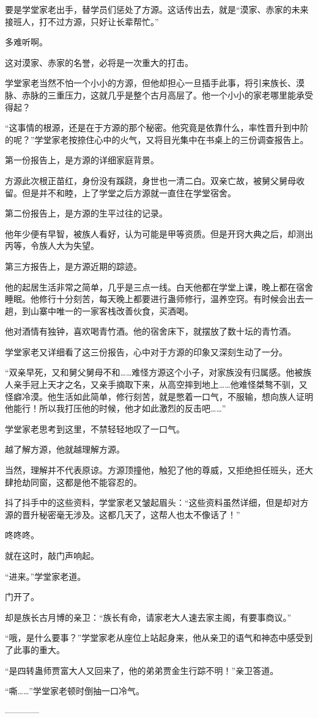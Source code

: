 \begin{this_body}
要是学堂家老出手，替学员们惩处了方源。这话传出去，就是“漠家、赤家的未来接班人，打不过方源，只好让长辈帮忙。”

多难听啊。

这对漠家、赤家的名誉，必将是一次重大的打击。

学堂家老当然不怕一个小小的方源，但他却担心一旦插手此事，将引来族长、漠脉、赤脉的三重压力，这就几乎是整个古月高层了。他一个小小的家老哪里能承受得起？

“这事情的根源，还是在于方源的那个秘密。他究竟是依靠什么，率性晋升到中阶的呢？”学堂家老按捺住心中的火气，又将目光集中在书桌上的三份调查报告上。

第一份报告上，是方源的详细家庭背景。

方源此次根正苗红，身份没有蹊跷，身世也一清二白。双亲亡故，被舅父舅母收留。但是并不和睦，上了学堂之后方源就一直住在学堂宿舍。

第二份报告上，是方源的生平过往的记录。

他年少便有早智，被族人看好，认为可能是甲等资质。但是开窍大典之后，却测出丙等，令族人大为失望。

第三方报告上，是方源近期的踪迹。

他的起居生活非常之简单，几乎是三点一线。白天他都在学堂上课，晚上都在宿舍睡眠。他修行十分刻苦，每天晚上都要进行蛊师修行，温养空窍。有时候会出去一趟，到山寨中唯一的一家客栈改善伙食，买酒喝。

他对酒情有独钟，喜欢喝青竹酒。他的宿舍床下，就摆放了数十坛的青竹酒。

学堂家老又详细看了这三份报告，心中对于方源的印象又深刻生动了一分。

“双亲早死，又和舅父舅母不和……难怪方源这个小子，对家族没有归属感。他被族人亲手冠上天才之名，又亲手摘取下来，从高空摔到地上……他难怪桀骜不驯，又怪癖冷漠。他生活如此简单，修行刻苦，就是憋着一口气，不服输，想向族人证明他能行！所以我打压他的时候，他才如此激烈的反击吧……”

学堂家老思考到这里，不禁轻轻地叹了一口气。

越了解方源，他就越理解方源。

当然，理解并不代表原谅。方源顶撞他，触犯了他的尊威，又拒绝担任班头，还大肆抢劫同窗，这都是他不能容忍的。

抖了抖手中的这些资料，学堂家老又皱起眉头：“这些资料虽然详细，但是却对方源的晋升秘密毫无涉及。这都几天了，这帮人也太不像话了！”

咚咚咚。

就在这时，敲门声响起。

“进来。”学堂家老道。

门开了。

却是族长古月博的亲卫：“族长有命，请家老大人速去家主阁，有要事商议。”

“哦，是什么要事？”学堂家老从座位上站起身来，他从亲卫的语气和神态中感受到了此事的重大。

“是四转蛊师贾富大人又回来了，他的弟弟贾金生行踪不明！”亲卫答道。

“嘶……”学堂家老顿时倒抽一口冷气。

------------

\end{this_body}

